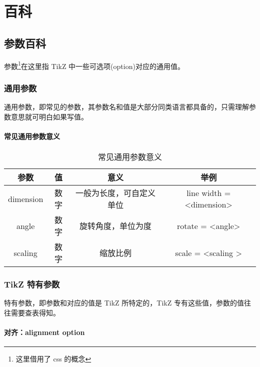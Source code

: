 \chapter{百科}
\section{参数百科}

参数\footnote{这里借用了 css 的概念}在这里指 TikZ 中一些可选项(option)对应的通用值。

\subsection{通用参数}

通用参数，即常见的参数，其参数名和值是大部分同类语言都具备的，只需理解参数意思就可明白如果写值。

\subsubsection{常见通用参数意义}

\begin{table}[H]
    \centering
    \caption{常见通用参数意义}
    \label{table:常见通用参数意义}
    \setlength{\tabcolsep}{5mm}
    \begin{tabular}{c|ccc}
        \toprule
        \textbf{参数} & \textbf{值} & \textbf{意义} & \textbf{举例}\\
        \midrule
        dimension & 数字 & 一般为长度，可自定义单位 & line width = <dimension>\\
        angle & 数字 & 旋转角度，单位为度 & rotate = <angle> \\
        scaling & 数字 & 缩放比例 & scale = <scaling  > \\
        \bottomrule
    \end{tabular}
\end{table}


\subsection{TikZ 特有参数}

特有参数，即参数和对应的值是 TikZ 所特定的，TikZ 专有这些值，参数的值往往需要查表得知。

\subsubsection{对齐：alignment option }

